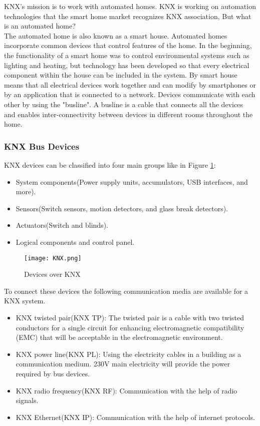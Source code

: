 \documentclass{article}
\begin{document}
KNX's mission is to work with automated homes. KNX is working on automation technologies that the smart home market recognizes KNX association, But what is an automated home?\\
The automated home is also known as a smart house. Automated homes incorporate common devices that control features of the home. In the beginning, the functionality of a smart home was to control environmental systems such as lighting and heating, but technology has been developed so that every electrical component within the house can be included in the system. By smart house means that all electrical devices work together and can modify by smartphones or by an application that is connected to a network. Devices communicate with each other by using the "busline". A busline is a cable that connects all the devices and enables inter-connectivity between devices in different rooms throughout the home. \cite{SETAG}\cite{Automation} \cite{TheAdaptiveHouse}
\subsubsection{KNX Bus Devices}
KNX devices can be classified into four main groups like in Figure \ref{fig:knx}: 
\begin{itemize}
    \item System components(Power supply units, accumulators, USB interfaces, and more).
    \item Sensors(Switch sensors, motion detectors, and glass break detectors).
    \item Actuators(Switch and blinds).
    \item Logical components and control panel\cite{Automation}. 
\end{itemize}  
\begin{figure}[h!]
    \centering
    \texttt{[image: KNX.png]}
    \caption{Devices over KNX}
    \label{fig:knx}
\end{figure}
To connect these devices the following communication media are available for a KNX system.\cite{KNXBasic} 
\begin{itemize}
    \item KNX twisted pair(KNX TP): The twisted pair is a cable with two twisted conductors for a single circuit 
    for enhancing electromagnetic compatibility (EMC) that will be acceptable
    in the electromagnetic environment.\cite{fdaEMC}
    \item KNX power line(KNX PL): Using the electricity cables in a building as a communication medium. 230V main electricity will provide the power required by bus devices.
    \item KNX radio frequency(KNX RF): Communication with the help of radio signals.
    \item KNX Ethernet(KNX IP): Communication with the help of internet protocols\cite{KNXBasic}.
\end{itemize}
\newpage
\end{document}
